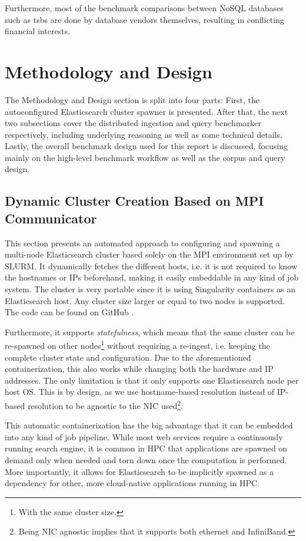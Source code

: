 Furthermore, most of the benchmark comparisons between NoSQL databases such as tsbs \cite{tsbs} are done by database vendors themselves, resulting in conflicting financial interests.

\section{Methodology and Design}
The Methodology and Design section is split into four parts: First, the autoconfigured Elasticsearch cluster spawner is presented. After that, the next two subsections cover the distributed ingestion and query benchmarker respectively, including underlying reasoning as well as some technical details. Lastly, the overall benchmark design used for this report is discussed, focusing mainly on the high-level benchmark workflow as well as the corpus and query design.

\subsection{Dynamic Cluster Creation Based on MPI Communicator}
This section presents an automated approach to configuring and spawning a multi-node Elasticsearch cluster based solely on the \ac{MPI} environment set up by SLURM. It dynamically fetches the different hosts, i.e. it is not required to know the hostnames or IPs beforehand, making it easily embeddable in any kind of job system. The cluster is very portable since it is using Singularity \cite{singularity} containers as an Elasticsearch host. Any cluster size larger or equal to two nodes is supported. The code can be found on GitHub \cite{myspawner}.

Furthermore, it supports \emph{statefulness}, which means that the same cluster can be re-spawned on other nodes\footnote{With the same cluster size.} without requiring a re-ingest, i.e. keeping the complete cluster state and configuration. Due to the aforementioned containerization, this also works while changing both the hardware and IP addresses. The only limitation is that it only supports one Elasticsearch node per host OS. This is by design, as we use hostname-based resolution instead of IP-based resolution to be agnostic to the \ac{NIC} used\footnote{Being \ac{NIC} agnostic implies that it supports both ethernet and InfiniBand.}. 

This automatic containerization has the big advantage that it can be embedded into any kind of job pipeline. While most web services require a continuously running search engine, it is common in \ac{HPC} that applications are spawned on demand only when needed and torn down once the computation is performed. More importantly, it allows for Elasticsearch to be implicitly spawned as a dependency for other, more cloud-native applications running in \ac{HPC}.\\

